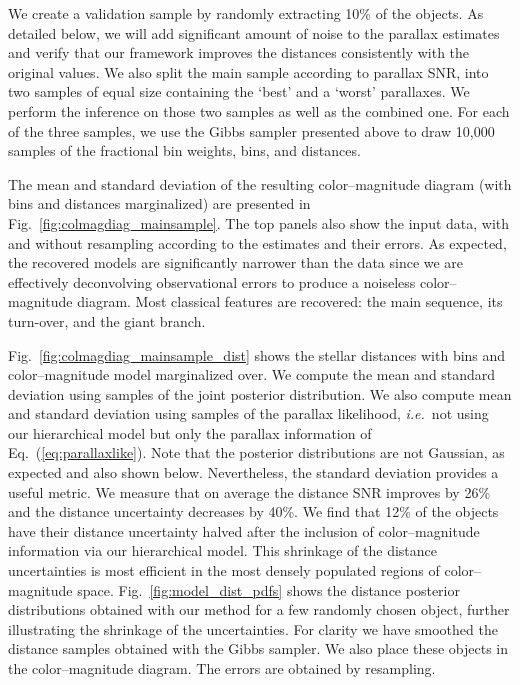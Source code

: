 \documentclass[manuscript, letterpaper]{aastex6}
\newcommand{\ie}{{\textit{i.e.}~}}
\newcommand{\equref}[1]{{\xspace}Eq.~(\ref{#1})}
\newcommand{\figref}[1]{{\xspace}Fig.~\ref{#1}}
\begin{document}
We create a validation sample by randomly extracting 10\% of the objects. 
As detailed below, we will add significant amount of noise to the parallax estimates and verify that our framework improves the distances consistently with the original values. 
We also split the main sample according to parallax SNR, into two samples of equal size containing the `best' and a `worst' parallaxes. 
We perform the inference on those two samples as well as the combined one. 
For each of the three samples, we use the Gibbs sampler presented above to draw 10,000 samples of the fractional bin weights, bins, and distances. 

The mean and standard deviation of the resulting color--magnitude diagram (with bins and distances marginalized) are presented in \figref{fig:colmagdiag_mainsample}.
The top panels also show the input data, with and without resampling according to the estimates and their errors.
As expected, the recovered models are significantly narrower than the data since we are effectively deconvolving observational errors to produce a noiseless color--magnitude diagram. 
Most classical features are recovered: the main sequence, its turn-over, and the giant branch.

\figref{fig:colmagdiag_mainsample_dist} shows the stellar distances with bins and color--magnitude model marginalized over. 
We compute the mean and standard deviation using samples of the joint posterior distribution. 
We also compute mean and standard deviation using samples of the parallax likelihood, \ie not using our hierarchical model but only the parallax information of \equref{eq:parallaxlike}.
Note that the posterior distributions are not Gaussian, as expected and also shown below. 
Nevertheless, the standard deviation provides a useful metric. 
We measure that on average the distance SNR improves by 26\% and the distance uncertainty decreases by 40\%.
We find that 12\% of the objects have their distance uncertainty halved after the inclusion of color--magnitude information via our hierarchical model.
This shrinkage of the distance uncertainties is most efficient in the most densely populated regions of color--magnitude space.
\figref{fig:model_dist_pdfs} shows the distance posterior distributions obtained with our method for a few randomly chosen object, further illustrating the shrinkage of the uncertainties.
For clarity we have smoothed the distance samples obtained with the Gibbs sampler.
We also place these objects in the color--magnitude diagram.
The errors are obtained by resampling.
\end{document}
